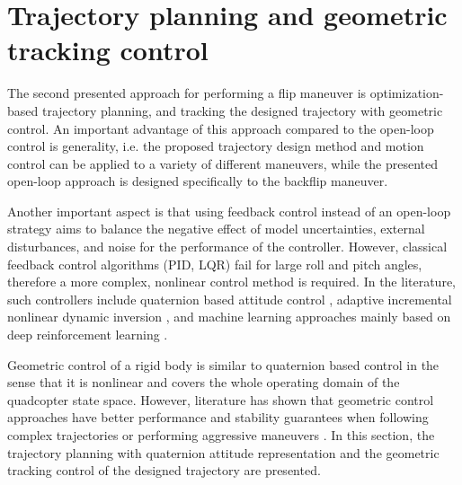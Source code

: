 \section{Trajectory planning and geometric tracking control}

The second presented approach for performing a flip maneuver is optimization-based trajectory planning, and tracking the designed trajectory with geometric control. An important advantage of this approach compared to the open-loop control is generality, i.e. the proposed trajectory design method and motion control can be applied to a variety of different maneuvers, while the presented open-loop approach is designed specifically to the backflip maneuver.

Another important aspect is that using feedback control instead of an open-loop strategy aims to balance the negative effect of model uncertainties, external disturbances, and noise for the performance of the controller. However, classical feedback control algorithms (PID, LQR) fail for large roll and pitch angles, therefore a more complex, nonlinear control method is required. In the literature, such controllers include quaternion based attitude control \cite{quaternion}, adaptive incremental nonlinear dynamic inversion \cite{indi2015}, and machine learning approaches mainly based on deep reinforcement learning \cite{drone-racing-deep-rl,deep_acrobatics, quadrotor-control-rl}. 

Geometric control of a rigid body is similar to quaternion based control in the sense that it is nonlinear and covers the whole operating domain of the quadcopter state space. However, literature has shown that geometric control approaches have better performance and stability guarantees when following complex trajectories or performing aggressive maneuvers \cite{lelemc2010, turpinkumar2011, mellinger2011}. In this section, the trajectory planning with quaternion attitude representation and the geometric tracking control of the designed trajectory are presented.

